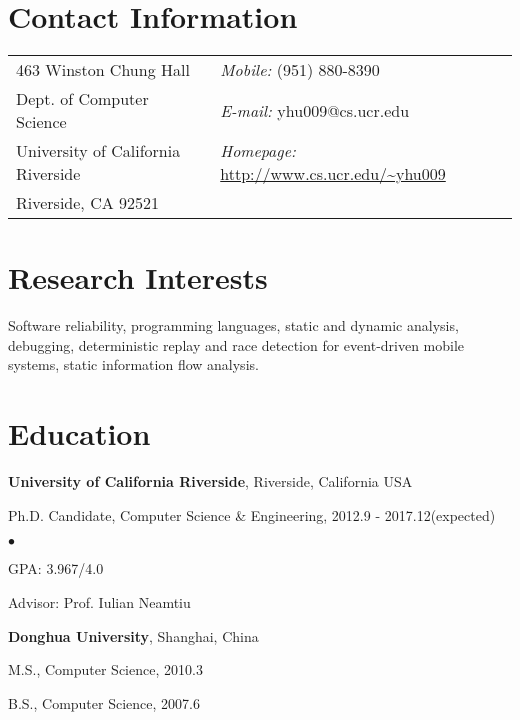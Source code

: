 \documentclass[margin,line]{res}
\newenvironment{list1}{
  \begin{list}{\ding{113}}{%
      \setlength{\itemsep}{0in}
      \setlength{\parsep}{0in} \setlength{\parskip}{0in}
      \setlength{\topsep}{0in} \setlength{\partopsep}{0in} 
      \setlength{\leftmargin}{0.17in}}}{\end{list}}
\newenvironment{list2}{
  \begin{list}{$\bullet$}{%
      \setlength{\itemsep}{0in}
      \setlength{\parsep}{0in} \setlength{\parskip}{0in}
      \setlength{\topsep}{0in} \setlength{\partopsep}{0in} 
      \setlength{\leftmargin}{0.2in}}}{\end{list}}
\begin{document}

\begin{resume}
\section{\sc Contact Information}
\vspace{.05in}
\begin{tabular}{@{}p{2in}p{4in}}
463 Winston Chung Hall              & {\it Mobile:}  (951) 880-8390 \\            
Dept. of Computer Science           & {\it E-mail:}  yhu009@cs.ucr.edu\\       
University of California Riverside  & {\it Homepage:} \url{http://www.cs.ucr.edu/~yhu009}\\
Riverside, CA 92521 
\end{tabular}


\section{\sc Research Interests}
Software reliability, programming languages, static and dynamic analysis, 
debugging, deterministic replay and race detection for event-driven mobile systems, 
static information flow analysis.


\section{\sc Education}
{\bf University of California Riverside}, Riverside, California USA\\
\vspace*{-.1in}
\begin{list1}
\item[] Ph.D. Candidate, Computer Science \& Engineering, 2012.9 - 2017.12(expected)
\begin{list2}
\vspace*{.05in}
\item GPA: 3.967/4.0
\item Advisor:  Prof. Iulian Neamtiu
\end{list2}
\end{list1}

{\bf Donghua University}, Shanghai, China\\
\vspace*{-.1in}
\begin{list1}
\item[] M.S., Computer Science,  2010.3
\item[] B.S., Computer Science,  2007.6
\end{list1}



\end{resume}
\end{document}
